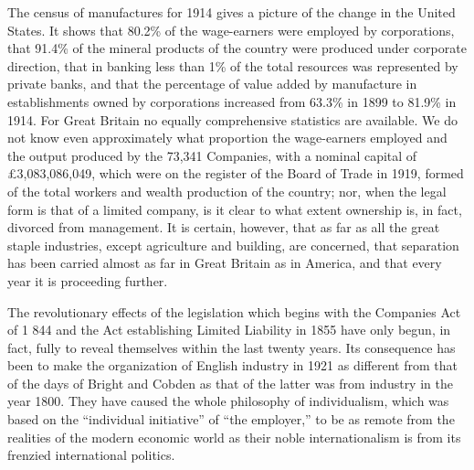 \documentclass{book}
\begin{document}
The census of manufactures for 1914 gives a picture of the change in the United States. It shows that 80.2\% of the wage-earners were employed by corporations, that 91.4\% of the mineral products of the country were produced under corporate direction, that in banking less than 1\% of the total resources was represented by private banks, and that the percentage of value added by manufacture in establishments owned by corporations increased from 63.3\% in 1899 to 81.9\% in 1914. For Great Britain no equally comprehensive statistics are available. We do not know even approximately what proportion the wage-earners employed and the output produced by the 73,341 Companies, with a nominal capital of £3,083,086,049, which were on the register of the Board of Trade in 1919, formed of the total workers and wealth production of the country; nor, when the legal form is that of a limited company, is it clear to what extent ownership is, in fact, divorced from management. It is certain, however, that as far as all the great staple industries, except agriculture and building, are concerned, that separation has been carried almost as far in Great Britain as in America, and that every year it is proceeding further.

The revolutionary effects of the legislation which begins with the Companies Act of 1 844 and the Act establishing Limited Liability in 1855 have only begun, in fact, fully to reveal themselves within the last twenty years. Its consequence has been to make the organization of English industry in 1921 as different from that of the days of Bright and Cobden as that of the latter was from industry in the year 1800. They have caused the whole philosophy of individualism, which was based on the “individual initiative” of “the employer,” to be as remote from the realities of the modern economic world as their noble internationalism is from its frenzied international politics.
\end{document}

